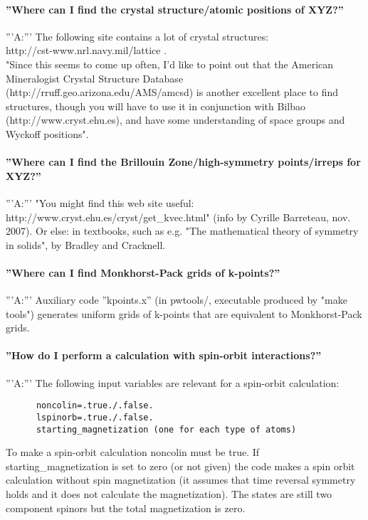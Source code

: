 \documentclass[12pt,a4paper]{article}
\begin{document}
\paragraph{ ''Where can I find the crystal structure/atomic positions of XYZ?''}
'''A:''' The following site contains a lot of crystal structures: \\
http://cst-www.nrl.navy.mil/lattice .\\
"Since this seems to come up often, I'd like to point out that the
American Mineralogist Crystal Structure Database
(http://rruff.geo.arizona.edu/AMS/amcsd) is another excellent place to
find structures, though you will have to use it in conjunction with
Bilbao (http://www.cryst.ehu.es),  
and have some understanding of space groups and Wyckoff positions".

\paragraph{ ''Where can I find the Brillouin Zone/high-symmetry
  points/irreps for XYZ?''} 
'''A:''' "You might find this web site useful:\\
http://www.cryst.ehu.es/cryst/get\_kvec.html" (info by Cyrille
Barreteau, nov. 2007). Or else: in textbooks, such as e.g. "The
mathematical theory of symmetry in solids", by Bradley and Cracknell.

\paragraph{ ''Where can I find Monkhorst-Pack grids of k-points?''}
'''A:''' Auxiliary code ''kpoints.x'' (in pwtools/, executable
produced by "make tools") generates uniform grids of k-points that are
equivalent to Monkhorst-Pack grids. 

\paragraph{ ''How do I perform a calculation with spin-orbit interactions?''}
'''A:'''  The following input variables are relevant for a spin-orbit
calculation: 
\begin{verbatim}
      noncolin=.true./.false.
      lspinorb=.true./.false.
      starting_magnetization (one for each type of atoms)
\end{verbatim}
To make a spin-orbit calculation noncolin must be true. 
If starting\_magnetization is set to zero (or not given)  the code
makes a spin orbit calculation without spin magnetization (it assumes
that time reversal symmetry holds and it does not calculate the
magnetization). The states are still two component spinors but the
total magnetization is zero. 
\end{document}
